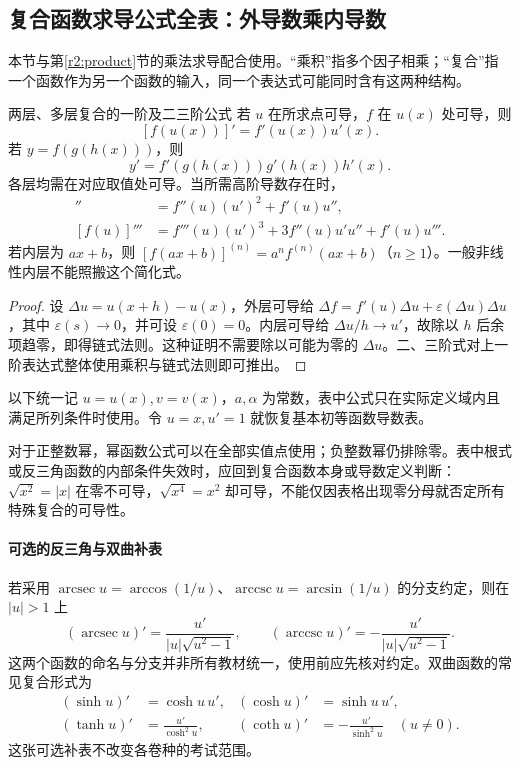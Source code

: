 \subsection{复合函数求导公式全表：外导数乘内导数}\label{r2:chain}
本节与第\ref{r2:product}节的乘法求导配合使用。“乘积”指多个因子相乘；“复合”指一个函数作为另一个函数的输入，同一个表达式可能同时含有这两种结构。

\begin{theorem}{两层、多层复合的一阶及二三阶公式}
若 $u$ 在所求点可导，$f$ 在 $u(x)$ 处可导，则
\[
 [f(u(x))]'=f'(u(x))u'(x).
\]
若 $y=f(g(h(x)))$，则
\[
 y'=f'(g(h(x)))g'(h(x))h'(x).
\]
各层均需在对应取值处可导。当所需高阶导数存在时，
\begin{align*}
 [f(u)]''&=f''(u)(u')^2+f'(u)u'',\\
 [f(u)]'''&=f'''(u)(u')^3+3f''(u)u'u''+f'(u)u'''.
\end{align*}
若内层为 $ax+b$，则 $[f(ax+b)]^{(n)}=a^n f^{(n)}(ax+b)$（$n\ge1$）。一般非线性内层不能照搬这个简化式。
\end{theorem}
\begin{proof}
设 $\Delta u=u(x+h)-u(x)$，外层可导给 $\Delta f=f'(u)\Delta u+\varepsilon(\Delta u)\Delta u$，其中 $\varepsilon(s)\to0$，并可设 $\varepsilon(0)=0$。内层可导给 $\Delta u/h\to u'$，故除以 $h$ 后余项趋零，即得链式法则。这种证明不需要除以可能为零的 $\Delta u$。二、三阶式对上一阶表达式整体使用乘积与链式法则即可推出。
\end{proof}

以下统一记 $u=u(x),v=v(x)$，$a,\alpha$ 为常数，表中公式只在实际定义域内且满足所列条件时使用。令 $u=x,u'=1$ 就恢复基本初等函数导数表。

对于正整数幂，幂函数公式可以在全部实值点使用；负整数幂仍排除零。表中根式或反三角函数的内部条件失效时，应回到复合函数本身或导数定义判断：$\sqrt{x^2}=|x|$ 在零不可导，$\sqrt{x^4}=x^2$ 却可导，不能仅因表格出现零分母就否定所有特殊复合的可导性。

\paragraph{可选的反三角与双曲补表}
若采用 $\operatorname{arcsec}u=\arccos(1/u)$、$\operatorname{arccsc}u=\arcsin(1/u)$ 的分支约定，则在 $|u|>1$ 上
\[
 (\operatorname{arcsec}u)'=\frac{u'}{|u|\sqrt{u^2-1}},\qquad
 (\operatorname{arccsc}u)'=-\frac{u'}{|u|\sqrt{u^2-1}}.
\]
这两个函数的命名与分支并非所有教材统一，使用前应先核对约定。双曲函数的常见复合形式为
\begin{align*}
 (\sinh u)'&=\cosh u\,u',&(\cosh u)'&=\sinh u\,u',\\
 (\tanh u)'&=\frac{u'}{\cosh^2u},&(\coth u)'&=-\frac{u'}{\sinh^2u}\quad(u\ne0).
\end{align*}
这张可选补表不改变各卷种的考试范围。

